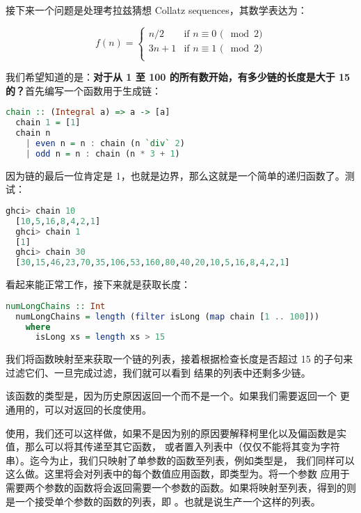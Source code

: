 \documentclass[./main.tex]{subfiles}
\begin{document}
接下来一个问题是处理考拉兹猜想 Collatz sequences，其数学表达为：

\begin{equation*}
  f(n) =
  \begin{cases}
    n / 2  & \text{if $n \equiv 0$ ($\mod 2$)} \\
    3n + 1 & \text{if $n \equiv 1$ ($\mod 2$)} \\
  \end{cases}
\end{equation*}

我们希望知道的是：\textbf{对于从 1 至 100 的所有数开始，有多少链的长度是大于 15 的？}首先编写一个函数用于生成链：

\begin{lstlisting}[language=Haskell]
  chain :: (Integral a) => a -> [a]
  chain 1 = [1]
  chain n
    | even n = n : chain (n `div` 2)
    | odd n = n : chain (n * 3 + 1)
\end{lstlisting}

因为链的最后一位肯定是 1，也就是边界，那么这就是一个简单的递归函数了。测试：

\begin{lstlisting}[language=Haskell]
  ghci> chain 10
  [10,5,16,8,4,2,1]
  ghci> chain 1
  [1]
  ghci> chain 30
  [30,15,46,23,70,35,106,53,160,80,40,20,10,5,16,8,4,2,1]
\end{lstlisting}

看起来能正常工作，接下来就是获取长度：

\begin{lstlisting}[language=Haskell]
  numLongChains :: Int
  numLongChains = length (filter isLong (map chain [1 .. 100]))
    where
      isLong xs = length xs > 15
\end{lstlisting}

我们将函数映射至\acode{[1..100]}来获取一个链的列表，接着根据检查长度是否超过 15 的子句来过滤它们、一旦完成过滤，我们就可以看到
结果的列表中还剩多少链。

\begin{anote}
  该函数的类型是，因为历史原因返回一个而不是一个。如果我们需要返回一个
  更通用的，可以对返回的长度使用。
\end{anote}

使用，我们还可以这样做，如果不是因为别的原因要解释柯里化以及偏函数是实值，那么可以将其传递至其它函数，
或者置入列表中（仅仅不能将其变为字符串）。迄今为止，我们只映射了单参数的函数至列表，例如类型是，
我们同样可以这么做。这里将会对列表中的每个数值应用函数\acode{*}，即类型为。将一个参数
应用于需要两个参数的函数将会返回需要一个参数的函数。如果将\acode{*}映射至列表\acode{[0..]}，得到的则是一个接受单个参数的函数的列表，即
。也就是说生产一个这样的列表\acode{[(0*),(1*),(2*),(3*),(4*),(5*)..]}。
\end{document}
